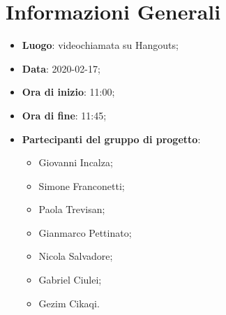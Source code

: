 \section{Informazioni Generali}
	\begin{itemize}
		\item \textbf {Luogo}: videochiamata su Hangouts;
		\item \textbf {Data}: 2020-02-17;
		\item \textbf {Ora di inizio}: 11:00;
		\item \textbf {Ora di fine}: 11:45;
		\item \textbf {Partecipanti del gruppo di progetto}:
			\begin{itemize}
				\item Giovanni Incalza;
				\item Simone Franconetti;
				\item Paola Trevisan;
				\item Gianmarco Pettinato;
				\item Nicola Salvadore;
				\item Gabriel Ciulei;
				\item Gezim Cikaqi.
			\end{itemize}
	\end{itemize}